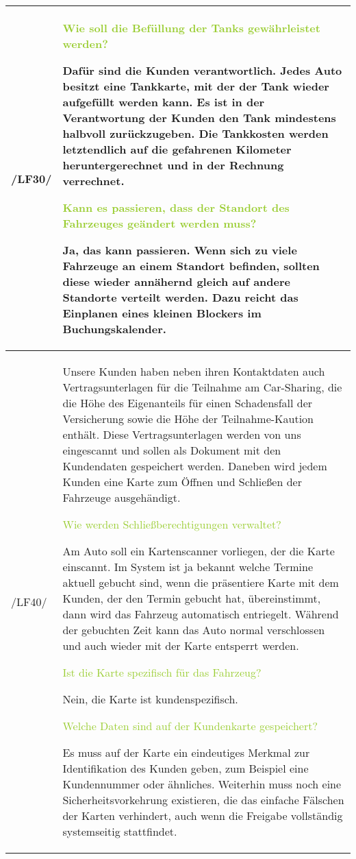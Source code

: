 \begin{tabular}{l | p{13cm}}
    \hline
    /LF30/ & \textcolor{YellowGreen}{Wie soll die Befüllung der Tanks gewährleistet werden?}

    \textcolor{NavyBlue}{Dafür sind die Kunden verantwortlich. Jedes Auto besitzt eine Tankkarte, mit der der Tank wieder aufgefüllt werden kann. Es ist in der Verantwortung der Kunden den Tank mindestens halbvoll zurückzugeben. Die Tankkosten werden letztendlich auf die gefahrenen Kilometer heruntergerechnet und in der Rechnung verrechnet.}

    \textcolor{YellowGreen}{Kann es passieren, dass der Standort des Fahrzeuges geändert werden muss?}

    \textcolor{NavyBlue}{Ja, das kann passieren. Wenn sich zu viele Fahrzeuge an einem Standort befinden, sollten diese wieder annähernd gleich auf andere Standorte verteilt werden. Dazu reicht das Einplanen eines kleinen Blockers im Buchungskalender.}
    \\
    \hline
    /LF40/ & Unsere Kunden haben neben ihren Kontaktdaten auch Vertragsunterlagen für die Teilnahme am Car-Sharing, die die Höhe des Eigenanteils für einen Schadensfall der Versicherung sowie die Höhe der Teilnahme-Kaution enthält. Diese Vertragsunterlagen werden von uns eingescannt und sollen als Dokument mit den Kundendaten gespeichert werden. Daneben wird jedem Kunden eine Karte zum Öffnen und Schließen der Fahrzeuge ausgehändigt. 

    \textcolor{YellowGreen}{Wie werden Schließberechtigungen verwaltet?}

    \textcolor{NavyBlue}{Am Auto soll ein Kartenscanner vorliegen, der die Karte einscannt. Im System ist ja bekannt welche Termine aktuell gebucht sind, wenn die präsentiere Karte mit dem Kunden, der den Termin gebucht hat, übereinstimmt, dann wird das Fahrzeug automatisch entriegelt. Während der gebuchten Zeit kann das Auto normal verschlossen und auch wieder mit der Karte entsperrt werden.}

    \textcolor{YellowGreen}{Ist die Karte spezifisch für das Fahrzeug?}

    \textcolor{NavyBlue}{Nein, die Karte ist kundenspezifisch.}

    \textcolor{YellowGreen}{Welche Daten sind auf der Kundenkarte gespeichert?}

    \textcolor{NavyBlue}{Es muss auf der Karte ein eindeutiges Merkmal zur Identifikation des Kunden geben, zum Beispiel eine Kundennummer oder ähnliches. Weiterhin muss noch eine Sicherheitsvorkehrung existieren, die das einfache Fälschen der Karten verhindert, auch wenn die Freigabe vollständig systemseitig stattfindet.} \\

    \hline
\end{tabular}


